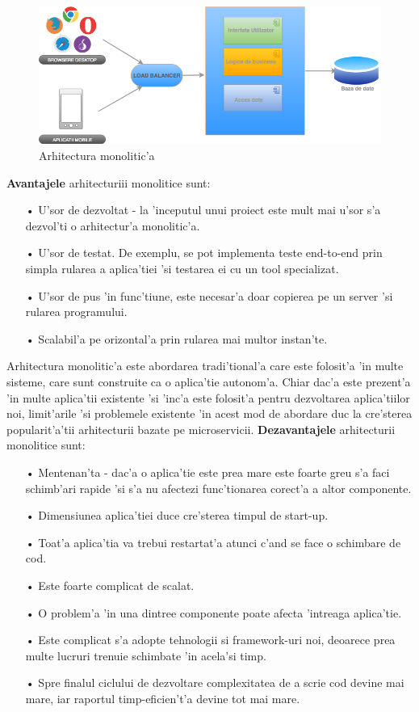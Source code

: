 \documentclass[12pt,a4paper,twoside]{report}
\begin{document}
\begin{figure}[H]
\begin{center}
\advance\leftskip-3cm
\advance\rightskip-3cm
\includegraphics[keepaspectratio=true,scale=0.5]{img/monolith_arhichitecture.png}
\caption{Arhitectura monolitic'a}
\label{monolith_arch}
\end{center}
\end{figure}
\textbf{Avantajele} arhitecturiii monolitice sunt: 
\begin{itemize}
\item[•]U'sor de dezvoltat - la 'inceputul unui proiect este mult mai u'sor s'a dezvol'ti o arhitectur'a monolitic'a.
\item[•]U'sor de testat. De exemplu, se pot implementa teste end-to-end prin simpla rularea a aplica'tiei 'si testarea ei cu un tool specializat.
\item[•]U'sor de pus 'in func'tiune, este necesar'a doar copierea pe un server 'si rularea programului.
\item[•]Scalabil'a pe orizontal'a prin rularea mai multor instan'te.
\end{itemize}
Arhitectura monolitic'a este abordarea tradi'tional'a care este folosit'a 'in multe sisteme, care sunt construite ca o aplica'tie autonom'a. Chiar dac'a este prezent'a 'in multe aplica'tii existente 'si 'inc'a este folosit'a pentru dezvoltarea aplica'tiilor noi, limit'arile 'si problemele existente 'in acest mod de abordare duc la cre'sterea popularit'a'tii arhitecturii bazate pe microservicii. \textbf{Dezavantajele} arhitecturii monolitice sunt:
\begin{itemize}
\item[•] Mentenan'ta - dac'a o aplica'tie este prea mare este foarte greu s'a faci schimb'ari rapide 'si s'a nu afectezi func'tionarea corect'a a altor componente.
\item[•]Dimensiunea aplica'tiei duce cre'sterea timpul de start-up.
\item[•]Toat'a aplica'tia va trebui restartat'a atunci c'and se face o schimbare de cod.
\item[•]Este foarte complicat de scalat.
\item[•]O problem'a 'in una dintree componente poate afecta 'intreaga aplica'tie.
\item[•]Este complicat s'a adopte tehnologii si framework-uri noi, deoarece prea multe lucruri trenuie schimbate 'in acela'si timp.
\item[•]Spre finalul ciclului de dezvoltare complexitatea de a scrie cod devine mai mare, iar raportul timp-eficien't'a devine tot mai mare.
\end{itemize}
\end{document}

